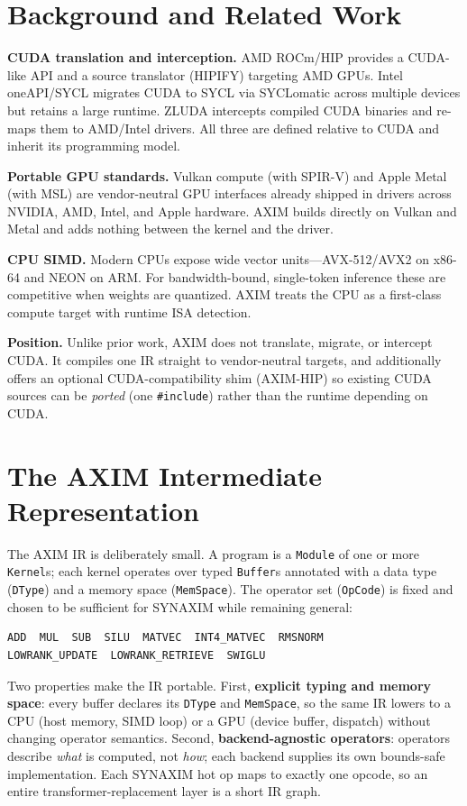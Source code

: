 \documentclass[11pt,a4paper]{article}
\begin{document}
\section{Background and Related Work}

\textbf{CUDA translation and interception.} AMD ROCm/HIP provides a CUDA-like API and a
source translator (HIPIFY) targeting AMD GPUs. Intel oneAPI/SYCL migrates CUDA to SYCL via
SYCLomatic across multiple devices but retains a large runtime. ZLUDA intercepts compiled
CUDA binaries and re-maps them to AMD/Intel drivers. All three are defined relative to
CUDA and inherit its programming model.

\textbf{Portable GPU standards.} Vulkan compute (with SPIR-V) and Apple Metal (with MSL)
are vendor-neutral GPU interfaces already shipped in drivers across NVIDIA, AMD, Intel, and
Apple hardware. AXIM builds directly on Vulkan and Metal and adds nothing between the kernel
and the driver.

\textbf{CPU SIMD.} Modern CPUs expose wide vector units---AVX-512/AVX2 on x86-64 and NEON on
ARM. For bandwidth-bound, single-token inference these are competitive when weights are
quantized. AXIM treats the CPU as a first-class compute target with runtime ISA detection.

\textbf{Position.} Unlike prior work, AXIM does not translate, migrate, or intercept CUDA.
It compiles one IR straight to vendor-neutral targets, and additionally offers an optional
CUDA-compatibility shim (AXIM-HIP) so existing CUDA sources can be \emph{ported} (one
\texttt{\#include}) rather than the runtime depending on CUDA.

\section{The AXIM Intermediate Representation}\label{sec:ir}

The AXIM IR is deliberately small. A program is a \texttt{Module} of one or more
\texttt{Kernel}s; each kernel operates over typed \texttt{Buffer}s annotated with a data
type (\texttt{DType}) and a memory space (\texttt{MemSpace}). The operator set
(\texttt{OpCode}) is fixed and chosen to be sufficient for SYNAXIM while remaining general:

\begin{lstlisting}
ADD  MUL  SUB  SILU  MATVEC  INT4_MATVEC  RMSNORM
LOWRANK_UPDATE  LOWRANK_RETRIEVE  SWIGLU
\end{lstlisting}

Two properties make the IR portable. First, \textbf{explicit typing and memory space}: every
buffer declares its \texttt{DType} and \texttt{MemSpace}, so the same IR lowers to a CPU
(host memory, SIMD loop) or a GPU (device buffer, dispatch) without changing operator
semantics. Second, \textbf{backend-agnostic operators}: operators describe \emph{what} is
computed, not \emph{how}; each backend supplies its own bounds-safe implementation. Each
SYNAXIM hot op maps to exactly one opcode, so an entire transformer-replacement layer is a
short IR graph.
\end{document}
